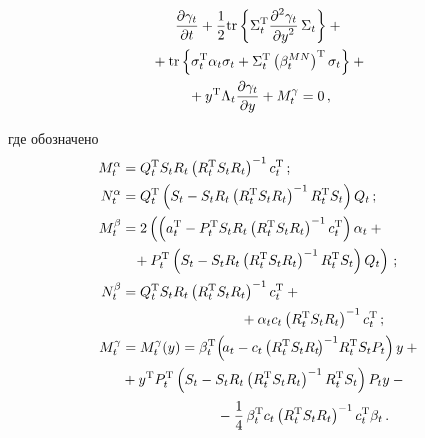 \begin{multicols}{2}
\vspace*{-12pt}

\noindent
\begin{multline}
     \displaystyle\frac{\displaystyle \partial \gamma_t\mathstrut}{\displaystyle \partial t\mathstrut} +
     \displaystyle\frac{\displaystyle 1\mathstrut}{\displaystyle 2\mathstrut}\mathrm{tr}\left\{ \Sigma_t^{\mathrm{T}} \displaystyle\frac{\displaystyle \partial^2 
\gamma_t\mathstrut}{\displaystyle \partial y^2\mathstrut}\,\Sigma_t\right\} +{}\\
{}+\mathrm{tr}\left\{ 
\sigma_t^{\mathrm{T}}\alpha_t\sigma_t+\Sigma_t^{\mathrm{T}} \left(\beta_t^{MN}\right)^{\mathrm{T}} 
\sigma_t\right\}+{}\\
{}+
     y^{\mathrm{T}}\Lambda_t\displaystyle\frac{\displaystyle \partial \gamma_t\mathstrut}{\displaystyle \partial y\mathstrut}+M_t^\gamma=0\,,
     \label{e21-bos}
     \end{multline}
     
     \vspace*{-6pt}
     
     \noindent
где обозначено
\begin{align*}
M_t^\alpha&= Q_t^{\mathrm{T}} S_t R_t\left( R_t^{\mathrm{T}} S_t R_t\right)^{-1} c_t^{\mathrm{T}}\,;\\[1pt]
N_t^\alpha &=Q_t^{\mathrm{T}}\left( S_t -S_t R_t\left( R_t^{\mathrm{T}} S_t R_t\right)^{-1} 
R_t^{\mathrm{T}}S_t\right)Q_t\,;\\[1pt]
M_t^\beta&=2\left(\left( a_t^{\mathrm{T}} -P_t^{\mathrm{T}} S_t R_t\left( R_t^{\mathrm{T}} S_t R_t\right)^{-1}
c_t^{\mathrm{T}}\right)\alpha_t+{}\right.\\[1pt]
&\left.\hspace{2mm}{}+P_t^{\mathrm{T}}\left( S_t-S_tR_t\left( R_t^{\mathrm{T}}S_tR_t\right)^{-1}R_t^{\mathrm{T}} 
S_t\right)Q_t\right)\,;\\[1pt]
N_t^\beta &= Q_t^{\mathrm{T}} S_t R_t\left( R_t^{\mathrm{T}} S_t R_t\right)^{-1} c_t^{\mathrm{T}} +{}\\[1pt]
&\hspace*{30mm}{}+\alpha_t c_t 
\left( R_t^{\mathrm{T}} S_t R_t\right)^{-1} c_t^{\mathrm{T}}\,;\\[1pt]
M_t^\gamma&= M_t^\gamma(y)=\beta_t^{\mathrm{T}} \! \left( \!a_t -c_t\left(R_t^{\mathrm{T}} S_t R_t\!\right)^{-1}\!
 R_t^{\mathrm{T}} S_t P_t\right) y +{}\\[1pt]
&{}+y^{\mathrm{T}} P_t^{\mathrm{T}} \left( S_t-S_tR_t\left( R_t^{\mathrm{T}} S_t R_t\right)^{-1} R_t^{\mathrm{T}} S_t\right) 
P_t y -{}\\[1pt]
&\hspace*{24mm}{}-\fr{1}{4}\,\beta_t^{\mathrm{T}} c_t\left( R_t^{\mathrm{T}} S_t R_t\right)^{-1} c_t^{\mathrm{T}} \beta_t\,.
\end{align*}
   

\end{multicols}
